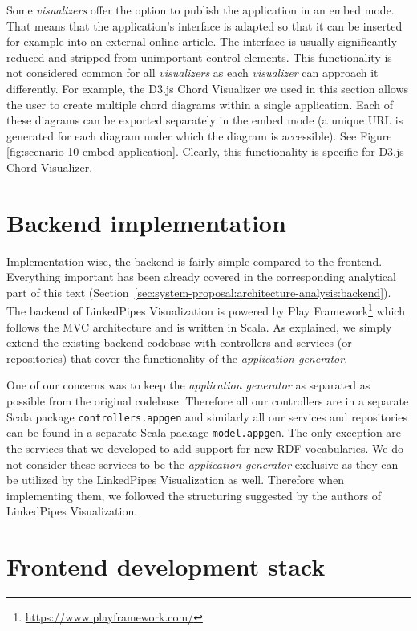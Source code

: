 Some \emph{visualizers} offer the option to publish the application in an embed mode. That means that the application's interface is adapted so that it can be inserted for example into an external online article. The interface is usually significantly reduced and stripped from unimportant  control elements. This functionality is not considered common for all \emph{visualizers}  as each \emph{visualizer} can approach it differently. For example, the D3.js Chord Visualizer we used in this section allows the user to create multiple chord diagrams within a single application. Each of these diagrams can be exported separately in the embed mode (a unique URL is generated for each diagram under which the diagram is accessible). See Figure \ref{fig:scenario-10-embed-application}. Clearly, this functionality is specific for D3.js Chord Visualizer.

\section{Backend implementation}

Implementation-wise, the backend is fairly simple compared to the frontend. Everything important has been already covered in the corresponding analytical part of this text (Section~\ref{sec:system-proposal:architecture-analysis:backend}). The backend of LinkedPipes Visualization is powered by Play Framework\footnote{\url{https://www.playframework.com/}} which follows the MVC architecture and is written in Scala. As explained, we simply extend the existing backend codebase with controllers and services (or repositories) that cover the functionality of the \emph{application generator}. 

One of our concerns was to keep the \emph{application generator} as separated as possible from the original codebase. Therefore all our controllers are in a separate Scala package \texttt{controllers.appgen} and similarly all our services and repositories can be found in a separate Scala package \texttt{model.appgen}. The only exception are the services that we developed to add support for new RDF vocabularies. We do not consider these services to be the \emph{application generator} exclusive as they can be utilized by the LinkedPipes Visualization as well. Therefore when implementing them, we followed the structuring suggested by the authors of LinkedPipes Visualization.

\section{Frontend development stack}
\label{sec:implementation:frontend-development-stack}

